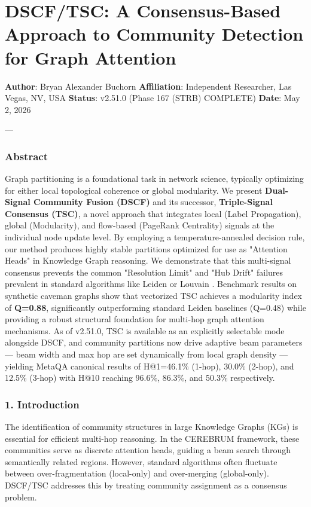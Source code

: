 \section{DSCF/TSC: A Consensus-Based Approach to Community Detection for Graph Attention}

\textbf{Author}: Bryan Alexander Buchorn  
\textbf{Affiliation}: Independent Researcher, Las Vegas, NV, USA  
\textbf{Status}: v2.51.0 (Phase 167 (STRB) COMPLETE)
\textbf{Date}: May 2, 2026

---

\subsubsection{Abstract}
Graph parti\-tioning is a found\-ational task in network science, typically optimizing for either local topological coherence or global modularity. We present \textbf{Dual-Signal Community Fusion (DSCF)} and its successor, \textbf{Triple-Signal Consensus (TSC)}, a novel approach that integrates local (Label Propagation), global (Modularity), and flow-based (PageRank Centrality) signals at the individual node update level. By employing a temperature-annealed decision rule, our method produces highly stable partitions optimized for use as "Attention Heads" in Knowledge Graph reasoning. We demonstrate that this multi-signal consensus prevents the common "Resolution Limit" and "Hub Drift" failures prevalent in standard algorithms like Leiden \cite{traag2019louvain} or Louvain \cite{blondel2008louvain}. Benchmark results on synthetic caveman graphs show that vectorized TSC achieves a modularity index of \textbf{Q=0.88}, signi\-ficantly outpe\-rforming standard Leiden baselines (Q=0.48) while providing a robust structural foundation for multi-hop graph attention mechanisms. As of v2.51.0, TSC is available as an explicitly selectable mode alongside DSCF, and community partitions now drive adaptive beam parameters — beam width and max hop are set dynamically from local graph density — yielding MetaQA canonical results of H@1=46.1\% (1-hop), 30.0\% (2-hop), and 12.5\% (3-hop) with H@10 reaching 96.6\%, 86.3\%, and 50.3\% respe\-ctively.

\subsubsection{1. Introd\-uction}
The ident\-ification of community structures in large Knowledge Graphs (KGs) is essential for efficient multi-hop reasoning. In the CEREBRUM framework, these communities serve as discrete attention heads, guiding a beam search through seman\-tically related regions. However, standard algorithms often fluctuate between over-fragm\-entation (local-only) and over-merging (global-only). DSCF/TSC addresses this by treating community assignment as a consensus problem.

